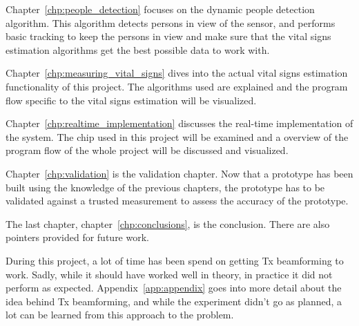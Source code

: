 Chapter~\ref{chp:people_detection} focuses on the dynamic people detection algorithm. This algorithm detects persons in view of the sensor, and performs basic tracking to keep the persons in view and make sure that the vital signs estimation algorithms get the best possible data to work with.

Chapter~\ref{chp:measuring_vital_signs} dives into the actual vital signs estimation functionality of this project. The algorithms used are explained and the program flow specific to the vital signs estimation will be visualized.

Chapter~\ref{chp:realtime_implementation} discusses the real-time implementation of the system. The chip used in this project will be examined and a overview of the program flow of the whole project will be discussed and visualized.

Chapter~\ref{chp:validation} is the validation chapter. Now that a prototype has been built using the knowledge of the previous chapters, the prototype has to be validated against a trusted measurement to assess the accuracy of the prototype.

The last chapter, chapter~\ref{chp:conclusions}, is the conclusion. There are also pointers provided for future work.

During this project, a lot of time has been spend on getting Tx beamforming to work. Sadly, while it should have worked well in theory, in practice it did not perform as expected. Appendix~\ref{app:appendix} goes into more detail about the idea behind Tx beamforming, and while the experiment didn't go as planned, a lot can be learned from this approach to the problem.

